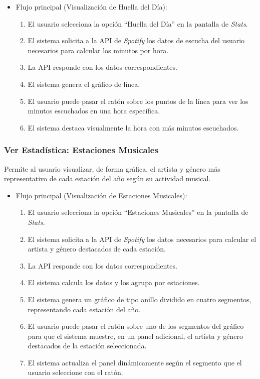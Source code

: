 \begin{itemize}
    \item Flujo principal (Visualización de Huella del Día):
          \begin{enumerate}
              \item El usuario selecciona la opción ``Huella del Día'' en la pantalla de \textit{Stats}.
              \item El sistema solicita a la API de \textit{Spotify} los datos de escucha del usuario necesarios para calcular los minutos por hora.
              \item La API responde con los datos correspondientes.
              \item El sistema genera el gráfico de línea.
              \item El usuario puede pasar el ratón sobre los puntos de la línea para ver los minutos escuchados en una hora específica.
              \item El sistema destaca visualmente la hora con más minutos escuchados.
          \end{enumerate}
\end{itemize}

\subsubsection*{Ver Estadística: Estaciones Musicales}

Permite al usuario visualizar, de forma gráfica, el artista y género más representativo de cada estación del año según su actividad musical.

\begin{itemize}
    \item Flujo principal (Visualización de Estaciones Musicales):
          \begin{enumerate}
              \item El usuario selecciona la opción ``Estaciones Musicales'' en la pantalla de \textit{Stats}.
              \item El sistema solicita a la API de \textit{Spotify} los datos necesarios para calcular el artista y género destacados de cada estación.
              \item La API responde con los datos correspondientes.
              \item El sistema calcula los datos y los agrupa por estaciones.
              \item El sistema genera un gráfico de tipo anillo dividido en cuatro segmentos, representando cada estación del año.
              \item El usuario puede pasar el ratón sobre uno de los segmentos del gráfico para que el sistema muestre, en un panel adicional, el artista y género destacados de la estación seleccionada.
              \item El sistema actualiza el panel dinámicamente según el segmento que el usuario seleccione con el ratón.
          \end{enumerate}
\end{itemize}

